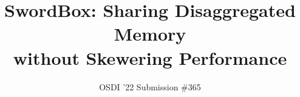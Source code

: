 \documentclass[10pt,twocolumn]{article}
\newcommand{\sword}{SwordBox}
\begin{document}

\title{\sword: Sharing Disaggregated Memory\\ without Skewering Performance}

\author{OSDI '22 Submission \#365}
\date{}

\maketitle












\appendix


\newpage

\balance
\vspace{-0.3cm}
{\footnotesize 
}
\vspace{-0.5cm}
\end{document}
